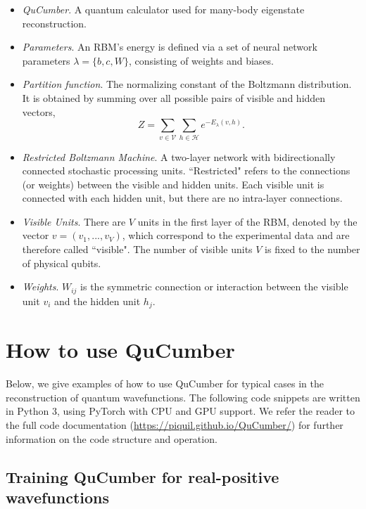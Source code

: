 \documentclass[submission, Phys]{SciPost}
\begin{document}
\begin{itemize}
\item {\it QuCumber}. A quantum calculator used for many-body eigenstate reconstruction.

\item {\it Parameters}.  An RBM's energy is defined via a set of neural network parameters $\lambda = \{b,c,W\}$, consisting of weights and biases.

\item {\it Partition function}. The normalizing constant of the Boltzmann distribution.  It is obtained by summing over all possible pairs of visible and hidden vectors,
\begin{equation}
    Z = \sum\limits_{v\in \mathcal{V}}\sum\limits_{h\in \mathcal{H}} e^{-E_{\lambda}(v,h)}.
\end{equation}

\item {\it Restricted Boltzmann Machine}.  A two-layer network with bidirectionally connected stochastic processing units.  ``Restricted" refers to the connections (or weights) between the visible and hidden units. Each visible unit is connected with each hidden unit, but there are no intra-layer connections.

\item {\it Visible Units}.  There are $V$ units in the first layer of the RBM, denoted by the vector $v=(v_1, ..., v_V)$, which correspond to the experimental data and are therefore called ``visible".  The number of visible units $V$ is fixed to the number of physical qubits.

\item {\it Weights}.  $W_{ij}$ is the symmetric connection or interaction between the visible unit $v_i$ and the hidden unit $h_j$.

\end{itemize}



\section{How to use QuCumber}

Below, we give examples of how to use QuCumber for typical cases in the reconstruction of quantum wavefunctions.  The following code snippets are written in Python 3, using PyTorch with CPU and GPU support.  We refer the reader to the full code documentation (\url{https://piquil.github.io/QuCumber/}) for further information on the code structure and operation.

\subsection{Training QuCumber for real-positive wavefunctions}
\end{document}
